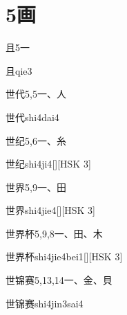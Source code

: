 
\section*{5画}

\begin{entry}{且}{5}{⼀}
  \begin{phonetics}{且}{qie3}
  \end{phonetics}
\end{entry}

\begin{entry}{世代}{5,5}{⼀、⼈}
  \begin{phonetics}{世代}{shi4dai4}
  \end{phonetics}
\end{entry}

\begin{entry}{世纪}{5,6}{⼀、⽷}
  \begin{phonetics}{世纪}{shi4ji4}[][HSK 3]
  \end{phonetics}
\end{entry}

\begin{entry}{世界}{5,9}{⼀、⽥}
  \begin{phonetics}{世界}{shi4jie4}[][HSK 3]
  \end{phonetics}
\end{entry}

\begin{entry}{世界杯}{5,9,8}{⼀、⽥、⽊}
  \begin{phonetics}{世界杯}{shi4jie4bei1}[][HSK 3]
  \end{phonetics}
\end{entry}

\begin{entry}{世锦赛}{5,13,14}{⼀、⾦、⾙}
  \begin{phonetics}{世锦赛}{shi4jin3sai4}
  \end{phonetics}
\end{entry}

